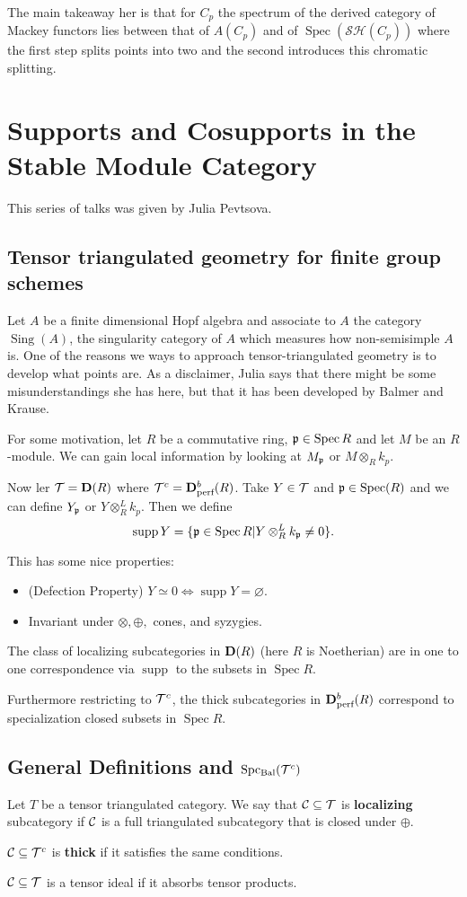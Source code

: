 \documentclass[12pt]{article}
\newcommand{\p}{\frakp}
\DeclareMathOperator{\Spec}{Spec}
\DeclareMathOperator{\supp}{supp}
\newcommand{\SH}{\mathcal{SH}}
\DeclareMathOperator{\Sing}{Sing}
\DeclareMathOperator{\SpcBal}{Spc_{Bal}}
\begin{document}
The main takeaway her is that for $C_p$ the spectrum of the derived category of Mackey functors lies between that 
of $A(C_p)$ and of $\Spec(\SH(C_p))$ where the first step splits points into two and the second introduces this chromatic splitting. 

\section{Supports and Cosupports in the Stable Module Category}
This series of talks was given by Julia Pevtsova.

\subsection{Tensor triangulated geometry for finite group schemes}
Let $A$ be a finite dimensional Hopf algebra and associate to $A$ the category $\Sing(A)$, the singularity category of $A$ which measures how non-semisimple
$A$ is. One of the reasons we ways to approach tensor-triangulated geometry is to develop what points are. As a disclaimer, Julia 
says that there might be some misunderstandings she has here, but that it has been developed by Balmer and Krause.

For some motivation, let $R$ be a commutative ring, $\p\in\Spec R$ and let $M$ be an $R$-module. We can gain local information 
by looking at $M_\p$ or $M\otimes_R k_p$.

Now ler $\mathcal{T}=\mathbf{D}(R)$ where $\mathcal{T}^c=\mathbf{D}^b_{\text{perf}}(R)$. Take $Y\in\mathcal{T}$ and $\p\in\Spec(R)$ and we can define $Y_\p$ or 
$Y\otimes_R^Lk_p$. Then we define 
\[\supp Y=\{\p\in\Spec R|Y\otimes_R^Lk_\p\ne 0\}.\]

This has some nice properties:
\begin{itemize}
	\item (Defection Property) $Y\simeq 0\Leftrightarrow \supp Y=\varnothing$.
	\item Invariant under $\otimes, \oplus,$ cones, and syzygies.
\end{itemize}
\begin{thm}[Neeman '92]
	The class of localizing subcategories in $\mathbf{D}(R)$ (here $R$ is Noetherian) are in one to one correspondence via $\supp$ to the subsets in $\Spec R$.

	Furthermore restricting to $\mathcal{T}^c$, the thick subcategories in $\mathbf{D}^b_{\text{perf}}(R)$ correspond to specialization closed subsets in $\Spec R$.
\end{thm}

\subsection{General Definitions and \texorpdfstring{$\SpcBal(\calT^c)$}{SpcBal(Tc)}}
\begin{defn}
	Let $T$ be a tensor triangulated category. We say that $\mathcal{C}\subseteq\mathcal{T}$ is \textbf{localizing} subcategory if $\mathcal{C}$ is a full triangulated 
	subcategory that is closed under $\oplus$.

	$\mathcal{C}\subseteq \mathcal{T}^c$ is \textbf{thick} if it satisfies the same conditions. 

	$\mathcal{C}\subseteq\mathcal{T}$ is a tensor ideal if it absorbs tensor products.
\end{defn}
\end{document}
